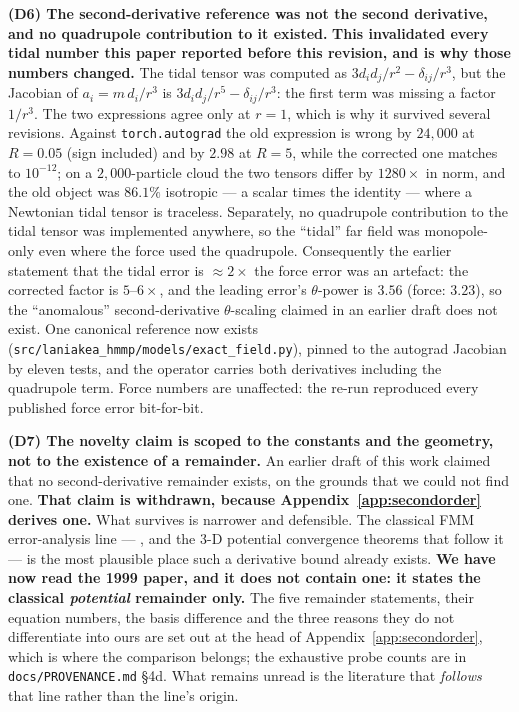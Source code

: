 \noindent\textbf{(D6) The second-derivative reference was not the second derivative, and no quadrupole
contribution to it existed.} \textbf{This invalidated every tidal number this paper reported before
this revision, and is why those numbers changed.} The tidal tensor was computed as
$3d_id_j/r^{2}-\delta_{ij}/r^{3}$, but the Jacobian of $a_i=m\,d_i/r^{3}$ is
$3d_id_j/r^{5}-\delta_{ij}/r^{3}$: the first term was missing a factor $1/r^{3}$. The two expressions
agree only at $r=1$, which is why it survived several revisions. Against
\texttt{torch.autograd} the old expression is wrong by $24{,}000$ at $R=0.05$ (sign included) and by
$2.98$ at $R=5$, while the corrected one matches to $10^{-12}$; on a $2{,}000$-particle cloud the two
tensors differ by $1280\times$ in norm, and the old object was $86.1\%$ isotropic --- a scalar times
the identity --- where a Newtonian tidal tensor is traceless. Separately, no quadrupole contribution to
the tidal tensor was implemented anywhere, so the ``tidal'' far field was monopole-only even where the
force used the quadrupole. Consequently the earlier statement that the tidal error is $\approx2\times$
the force error was an artefact: the corrected factor is $5$--$6\times$, and the leading error's
$\theta$-power is $3.56$ (force: $3.23$), so the ``anomalous'' second-derivative $\theta$-scaling
claimed in an earlier draft does not exist. One canonical reference now exists
(\texttt{src/\allowbreak laniakea\_\allowbreak hmmp/\allowbreak models/\allowbreak exact\_\allowbreak field.\allowbreak py}), pinned to the autograd Jacobian by eleven tests,
and the operator carries both derivatives including the quadrupole term. Force numbers are unaffected:
the re-run reproduced every published force error bit-for-bit.

\noindent\textbf{(D7) The novelty claim is scoped to the constants and the geometry, not to the
existence of a remainder.} An earlier draft of this work claimed that no second-derivative remainder
exists, on the grounds that we could not find one. \textbf{That claim is withdrawn, because
Appendix~\ref{app:secondorder} derives one.} What survives is narrower and defensible. The classical
FMM error-analysis line --- \citet{cheng1999fast}, and the 3-D potential
convergence theorems that follow it --- is the most plausible place such a derivative bound already
exists. \textbf{We have now read the 1999 paper, and it does not contain one: it states the classical
\emph{potential} remainder only.} The five remainder statements, their equation numbers, the basis
difference and the three reasons they do not differentiate into ours are set out at the head of
Appendix~\ref{app:secondorder}, which is where the comparison belongs; the exhaustive probe counts are
in \texttt{docs/\allowbreak PROVENANCE.\allowbreak md} \S4d. What remains unread is the literature that \emph{follows} that
line rather than the line's origin.

